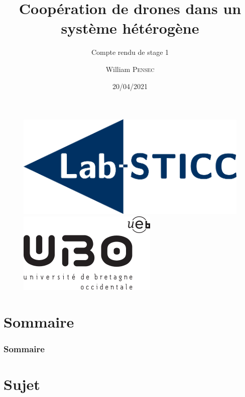 \documentclass[12pt]{beamer}
\title[Compte rendu de stage 1]{Coopération de drones dans un système hétérogène}
\subtitle{Compte rendu de stage 1}
\author{William \textsc{Pensec}}
\institute{Lab-Sticc}
\date{20/04/2021}
\begin{document}
	\begin{frame}
		\begin{titlepage}
			\begin{figure}[H]
				\centering
				\includegraphics[scale=.15]{labsticc.png}
				\hspace{3cm}
				\includegraphics[scale=.3]{ubo.png}
			\end{figure}
		\end{titlepage}
	\end{frame}
	
	\section*{Sommaire}
	\begin{frame}
		\frametitle{Sommaire}
		\begin{center}
			\tableofcontents
		\end{center}
	\end{frame}
	
	\section{Sujet}
\end{document}
